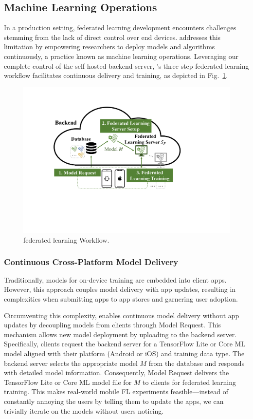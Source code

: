 \subsection{Machine Learning Operations}
\label{sec:mlops}

\newcommand{\model}{$M$}
\newcommand{\fs}{$S_\mathrm F$}
In a production setting,
federated learning development encounters challenges stemming from the lack of
direct control over end devices.
\fedkit addresses this limitation by empowering researchers to deploy models and
algorithms continuously, a practice known as machine learning operations.
Leveraging our complete control of the self-hosted backend server,
\fedkit's three-step federated learning workflow facilitates continuous delivery
and training, as depicted in Fig.~\ref{fig:fl-workflow}.

\begin{figure}\begin{center}
        \includegraphics[width=0.7\linewidth]{fl_workflow.pdf}
        \caption{\fedkit federated learning Workflow.}
        \label{fig:fl-workflow}
    \end{center}\end{figure}

\subsubsection{Continuous Cross-Platform Model Delivery}
Traditionally, models for on-device training are embedded into client apps.
However, this approach couples model delivery with app updates,
resulting in complexities when submitting apps to app stores and garnering user
adoption.

Circumventing this complexity,
\fedkit enables continuous model delivery without app updates by decoupling
models from clients through Model Request. This mechanism allows new model
deployment by uploading to the backend server. Specifically,
clients request the backend server for a TensorFlow Lite or Core ML model
aligned with their platform (Android or iOS) and training data type.
The backend server selects the appropriate model \model{}
from the database and responds with detailed model information. Consequently,
Model Request delivers the TensorFlow Lite or Core ML model file for \model{}
to clients for federated learning training.
This makes real-world mobile FL experiments feasible---instead of constantly
annoying the users by telling them to update the apps,
we can trivially iterate on the models without users noticing.

